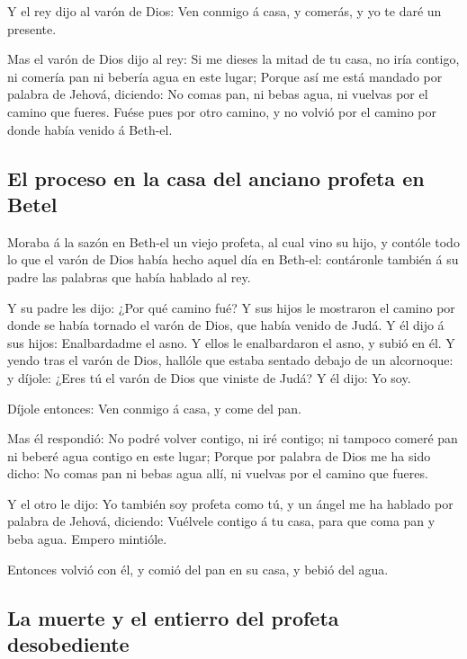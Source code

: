  Y el rey dijo al varón de Dios: Ven conmigo á casa, y
comerás, y yo te daré un presente.

 Mas el varón de Dios dijo al rey: Si me dieses la mitad
de tu casa, no iría contigo, ni comería pan ni bebería agua en este
lugar;  Porque así me está mandado por palabra de Jehová,
diciendo: No comas pan, ni bebas agua, ni vuelvas por el camino que
fueres.  Fuése pues por otro camino, y no volvió por el
camino por donde había venido á Beth-el.

\hypertarget{el-proceso-en-la-casa-del-anciano-profeta-en-betel}{%
\subsection{El proceso en la casa del anciano profeta en
Betel}\label{el-proceso-en-la-casa-del-anciano-profeta-en-betel}}

 Moraba á la sazón en Beth-el un viejo profeta, al cual
vino su hijo, y contóle todo lo que el varón de Dios había hecho aquel
día en Beth-el: contáronle también á su padre las palabras que había
hablado al rey.

 Y su padre les dijo: ¿Por qué camino fué? Y sus hijos le
mostraron el camino por donde se había tornado el varón de Dios, que
había venido de Judá.  Y él dijo á sus hijos:
Enalbardadme el asno. Y ellos le enalbardaron el asno, y subió en él.
 Y yendo tras el varón de Dios, hallóle que estaba
sentado debajo de un alcornoque: y díjole: ¿Eres tú el varón de Dios que
viniste de Judá? Y él dijo: Yo soy.

 Díjole entonces: Ven conmigo á casa, y come del pan.

 Mas él respondió: No podré volver contigo, ni iré
contigo; ni tampoco comeré pan ni beberé agua contigo en este lugar;
 Porque por palabra de Dios me ha sido dicho: No comas
pan ni bebas agua allí, ni vuelvas por el camino que fueres.

 Y el otro le dijo: Yo también soy profeta como tú, y un
ángel me ha hablado por palabra de Jehová, diciendo: Vuélvele contigo á
tu casa, para que coma pan y beba agua. Empero mintióle.

 Entonces volvió con él, y comió del pan en su casa, y
bebió del agua.

\hypertarget{la-muerte-y-el-entierro-del-profeta-desobediente}{%
\subsection{La muerte y el entierro del profeta
desobediente}\label{la-muerte-y-el-entierro-del-profeta-desobediente}}

